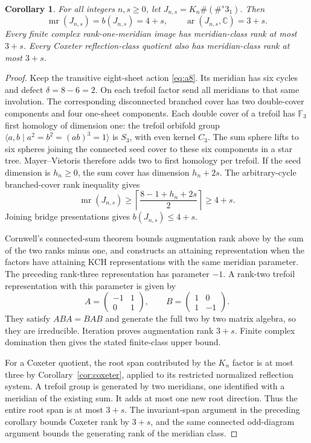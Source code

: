 \documentclass[11pt]{article}
\newtheorem{corollary}[theorem]{Corollary}
\newcommand{\mr}{\operatorname{mr}}
\newcommand{\ar}{\operatorname{ar}}
\newcommand{\C}{\mathbb C}
\newcommand{\F}{\mathbb F}
\begin{document}
\begin{corollary}\label{cor:sums}
For all integers $n,s\ge0$, let $J_{n,s}=K_n\#(\#^s3_1)$. Then
\[
 \mr(J_{n,s})=b(J_{n,s})=4+s,\qquad
 \ar(J_{n,s},\C)=3+s.
\]
Every finite complex rank-one-meridian image has meridian-class
rank at most $3+s$. Every Coxeter reflection-class quotient also has
meridian-class rank at most $3+s$.
\end{corollary}
\begin{proof}
Keep the transitive eight-sheet action \eqref{eq:a8}. Its meridian
has six cycles and defect $\delta=8-6=2$. On each trefoil factor send
all meridians to that same involution. The corresponding disconnected
branched cover has two double-cover components and four one-sheet
components. Each double cover of a trefoil has $\F_3$ first homology
of dimension one: the trefoil orbifold group
$\langle a,b\mid a^2=b^2=(ab)^3=1\rangle$ is $S_3$, with even
kernel $C_3$.
The sum sphere lifts to six spheres joining the connected seed cover
to these six components in a star tree. Mayer--Vietoris therefore
adds two to first homology per trefoil. If the seed dimension is
$h_n\ge0$, the sum cover has dimension $h_n+2s$.
The arbitrary-cycle branched-cover rank inequality
\cite[Theorem \texttt{thm:general}]{cover} gives
\[
 \mr(J_{n,s})\ge\left\lceil\frac{8-1+h_n+2s}{2}\right\rceil
 \ge4+s.
\]
Joining bridge presentations gives $b(J_{n,s})\le4+s$.

Cornwell's connected-sum theorem
\cite[Theorem~1.9]{cornwell} bounds augmentation rank above by the sum
of the two ranks minus one, and constructs an attaining representation
when the factors have attaining KCH representations with the same
meridian parameter. The preceding rank-three representation has
parameter $-1$. A rank-two trefoil representation with this parameter
is given by
\[
 A=\begin{pmatrix}-1&1\\0&1\end{pmatrix},\qquad
 B=\begin{pmatrix}1&0\\1&-1\end{pmatrix}.
\]
They satisfy $ABA=BAB$ and generate the full two by two matrix algebra,
so they are irreducible. Iteration proves augmentation rank $3+s$.
Finite complex domination then gives the stated finite-class upper
bound.

For a Coxeter quotient, the root span contributed by the $K_n$ factor
is at most three by Corollary~\ref{cor:coxeter}, applied to its
restricted normalized reflection system. A trefoil group is generated
by two meridians, one identified with a meridian of the existing sum.
It adds at most one new root direction. Thus the entire root span is
at most $3+s$. The invariant-span argument in the preceding corollary
bounds Coxeter rank by $3+s$, and the same connected odd-diagram
argument bounds the generating rank of the meridian class.
\end{proof}
\end{document}

